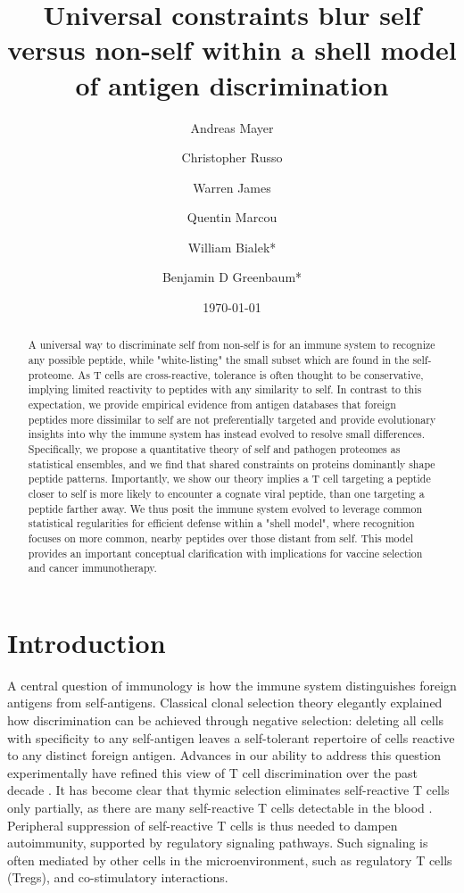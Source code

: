 \documentclass[superscriptaddress,twocolumn,pre]{revtex4}
\newcommand{\<}{\langle}
\renewcommand{\>}{\rangle}
\begin{document}
\title{Universal constraints blur self versus non-self within a shell model of antigen discrimination}
\author{Andreas Mayer}
\author{Christopher Russo}
\author{Warren James}
\author{Quentin Marcou}
\author{William Bialek*}
\author{Benjamin D Greenbaum*}
\date{\today}

\begin{abstract}
    A universal way to discriminate self from non-self is for an immune system to recognize any possible peptide, while "white-listing" the small subset which are found in the self-proteome. As T cells are cross-reactive, tolerance is often thought to be conservative, implying limited reactivity to peptides with any similarity to self. In contrast to this expectation, we provide empirical evidence from antigen databases that foreign peptides more dissimilar to self are not preferentially targeted and provide evolutionary insights into why the immune system has instead evolved to resolve small differences. Specifically, we propose a quantitative theory of self and pathogen proteomes as statistical ensembles, and we find that shared constraints on proteins dominantly shape peptide patterns. Importantly, we show our theory implies a T cell targeting a peptide closer to self is more likely to encounter a cognate viral peptide, than one targeting a peptide farther away. We thus posit the immune system evolved to leverage common statistical regularities for efficient defense within a "shell model", where recognition focuses on more common, nearby peptides over those distant from self. This model provides an important conceptual clarification with implications for vaccine selection and cancer immunotherapy.
\end{abstract}

\maketitle

\section{Introduction}

A central question of immunology is how the immune system distinguishes foreign antigens from self-antigens. Classical clonal selection theory elegantly explained how discrimination can be achieved through negative selection: deleting all cells with specificity to any self-antigen leaves a self-tolerant repertoire of cells reactive to any distinct foreign antigen. Advances in our ability to address this question experimentally have refined this view of T cell discrimination over the past decade \cite{Davis2015, Birnbaum2014}. It has become clear that thymic selection eliminates self-reactive T cells only partially, as there are many self-reactive T cells detectable in the blood \cite{Davis2015}. Peripheral suppression of self-reactive T cells is thus needed to dampen autoimmunity, supported by regulatory signaling pathways. Such signaling is often mediated by other cells in the microenvironment, such as regulatory T cells (Tregs), and co-stimulatory interactions.
\end{document}
